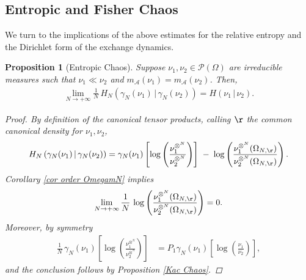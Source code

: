 \documentclass[11pt,reqno]{amsart}
\numberwithin{equation}{section}
\numberwithin{figure}{section}
\newtheorem{proposition}[theorem]{Proposition}
\newcommand{\1}{\mathds{1}}
\newcommand{\tc}{\,|\,}
\begin{document}
\subsection{Entropic  and Fisher Chaos} \label{sec:chaos}
We turn to the implications of the above estimates for the relative entropy and the Dirichlet form of the exchange dynamics. 
\begin{proposition}[Entropic Chaos]\label{Entropic Chaos}
Suppose $\nu_1,\nu_2 \in\mathcal{P}(\Omega)$ are irreducible measures such that $\nu_1\ll\nu_2$ and $m_\mathcal{A}(\nu_1)=m_\mathcal{A}(\nu_2)$. 
Then,
\begin{align*}
\lim_{N\to +\infty} \frac{1}{N}\, H_N\left(\gamma_N (\nu_1)\tc\gamma_N (\nu_2)\right) = H(\nu_1\tc\nu_2).
\end{align*}
\begin{proof}
By  definition of the canonical tensor products, calling $\r$ the common canonical density for $\nu_1,\nu_2$,  \[
H_N\left(\gamma_N (\nu_1)\tc\gamma_N (\nu_2)\right) 
=\gamma_N (\nu_1)\left[ \log\left(\frac{\nu_1^{\otimes^N}}{\nu_2^{\otimes^N}}\right)\right]\;-\;
\log\left(\frac{\nu_1^{\otimes^N}(\Omega_{N,\r})}{\nu_2^{\otimes^N}(\Omega_{N,\r}) }\right).
\]    
Corollary \ref{cor order OmegamN} implies \begin{equation}\label{ratio corollary}
\lim_{N\to +\infty} \frac{1}{N}\, \log\left(\frac{\nu_1^{\otimes^N}(\Omega_{N,\r})}{\nu_2^{\otimes^N}(\Omega_{N,\r}) }\right)
=0.
\end{equation}
Moreover, by symmetry %
\begin{align}
\frac{1}{N}\,\gamma_N (\nu_1)\left[ \log\left(\frac{\nu_1^{\otimes^N}}{\nu_2^{\otimes^N}}\right)\right]
&= P_1 \gamma_N (\nu_1)\left[ \log\left( \frac{\nu_1}{\nu_2} \right) \right],
\end{align}
and the conclusion follows by Proposition \ref{Kac Chaos}.
\end{proof}
\end{proposition}
\end{document}
